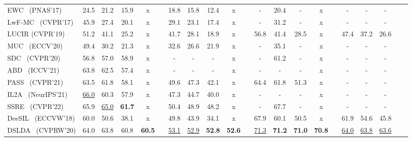 \documentclass[10pt,twocolumn,letterpaper]{article}
\begin{document}
\begin{table*}[t]
\begin{center}
{\begin{tabular}{@{\kern0.5em}llccccccccccccccccccc@{\kern0.5em}}
EWC~\cite{kirkpatrick2017overcoming} \small (PNAS'17)    & 24.5 & 21.2 & 15.9 & x && 18.8 & 15.8 & 12.4 & x && -    & 20.4 & - & x  && - & - & - \\
LwF-MC~\cite{rebuffi2017_icarl} \small (CVPR'17) & 45.9 & 27.4 & 20.1 & x && 29.1 & 23.1 & 17.4 & x && -    & 31.2 & - & x  && - & - & - \\    
LUCIR \small (CVPR'19)      & 51.2 & 41.1 & 25.2 & x && 41.7 & 28.1 & 18.9 & x && 56.8 & 41.4 & 28.5  & x && 47.4 & 37.2 & 26.6 \\  
MUC~\cite{liu2020more} \small (ECCV'20)    & 49.4 & 30.2 & 21.3 & x && 32.6 & 26.6 & 21.9 & x && -    & 35.1 & - & x && - & - & - \\   
SDC~\cite{sdc_2020} \small (CVPR'20)    & 56.8 & 57.0 & 58.9 & x &&   -  & -    &-  & x  && -    & 61.2 & - & x && - & - & - \\   
ABD~\cite{smith2021always} \small (ICCV'21)    & 63.8 & 62.5 & 57.4 & x &&   -  & -    &- & x    && -    & - & - & x && - & - & - \\ 
PASS~\cite{zhu2021pass} \small (CVPR'21)   & 63.5 & 61.8 & 58.1 & x && 49.6 & 47.3 & 42.1 & x && 64.4   & 61.8 & {51.3} & x && - & - & - \\ 
IL2A~\cite{zhu2021class} \small (NeurIPS'21)& \underline{66.0} & 60.3 & 57.9 & x && 47.3 & 44.7 & 40.0  & x && - & - & - & x  && - & - & - \\ 
SSRE~\cite{zhu2022self} \small (CVPR'22)   & 65.9 & \underline{65.0} & \textbf{61.7} & x && {50.4} & {48.9} & {48.2} & x && -    & {67.7} &  - & x && - & - & - \\ 
\hline
DeeSIL~\cite{belouadah2018_deesil} \small (ECCVW'18)    & 60.0 & 50.6 & 38.1 & x && 49.8 & 43.9 & 34.1 & x &&  {67.9} & 60.1 & 50.5 & x && 61.9 & 54.6 & 45.8 \\

DSLDA~\cite{hayes2020_deepslda} \small (CVPRW'20)   & 64.0 & 63.8 & 60.8 & \textbf{60.5} && \underline{53.1} & \underline{52.9} & \textbf{52.8} & \textbf{52.6} && \underline{71.3}  & \textbf{71.2} &  \textbf{71.0} & \textbf{70.8} && \underline{64.0} & \underline{63.8} & \underline{63.6} \\


\end{tabular}}
\end{center}
\end{table*}
\end{document}
